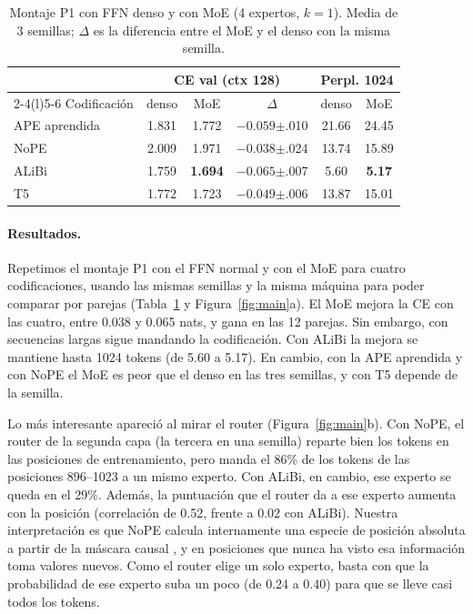 \documentclass[11pt]{article}
\newcommand{\pmsd}[1]{{\scriptsize$\pm$#1}}
\begin{document}
\begin{table}[t]
\centering\small\setlength{\tabcolsep}{3pt}
\begin{tabular}{@{}lccccc@{}}
\toprule
 & \multicolumn{3}{c}{CE val (ctx 128)} & \multicolumn{2}{c}{Perpl. 1024} \\
\cmidrule(lr){2-4}\cmidrule(l){5-6}
Codificación & denso & MoE & $\Delta$ & denso & MoE \\
\midrule
APE aprendida & 1.831 & 1.772 & $-0.059$\pmsd{.010} & 21.66 & 24.45 \\
NoPE & 2.009 & 1.971 & $-0.038$\pmsd{.024} & 13.74 & 15.89 \\
ALiBi & 1.759 & \textbf{1.694} & $-0.065$\pmsd{.007} & 5.60 & \textbf{5.17} \\
T5 & 1.772 & 1.723 & $-0.049$\pmsd{.006} & 13.87 & 15.01 \\
\bottomrule
\end{tabular}
\caption{Montaje P1 con FFN denso y con MoE (4 expertos, $k{=}1$). Media de 3 semillas; $\Delta$ es la diferencia entre el MoE y el denso con la misma semilla.}
\label{tab:combo}
\end{table}

\paragraph{Resultados.}
Repetimos el montaje P1 con el FFN normal y con el MoE para cuatro codificaciones, usando las mismas semillas y la misma máquina para poder comparar por parejas (Tabla~\ref{tab:combo} y Figura~\ref{fig:main}a).
El MoE mejora la CE con las cuatro, entre 0.038 y 0.065 nats, y gana en las 12 parejas.
Sin embargo, con secuencias largas sigue mandando la codificación.
Con ALiBi la mejora se mantiene hasta 1024 tokens (de 5.60 a 5.17). En cambio, con la APE aprendida y con NoPE el MoE es peor que el denso en las tres semillas, y con T5 depende de la semilla.

Lo más interesante apareció al mirar el router (Figura~\ref{fig:main}b).
Con NoPE, el router de la segunda capa (la tercera en una semilla) reparte bien los tokens en las posiciones de entrenamiento, pero manda el 86\% de los tokens de las posiciones 896--1023 a un mismo experto. Con ALiBi, en cambio, ese experto se queda en el 29\%.
Además, la puntuación que el router da a ese experto aumenta con la posición (correlación de 0.52, frente a 0.02 con ALiBi).
Nuestra interpretación es que NoPE calcula internamente una especie de posición absoluta a partir de la máscara causal \citep{kazemnejad2023impact}, y en posiciones que nunca ha visto esa información toma valores nuevos.
Como el router elige un solo experto, basta con que la probabilidad de ese experto suba un poco (de 0.24 a 0.40) para que se lleve casi todos los tokens.
\end{document}
